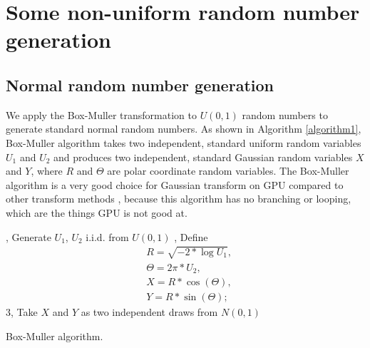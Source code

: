 \documentclass[article,nojss]{jss}\usepackage[]{graphicx}\usepackage[]{color}
\begin{document}







\section{Some non-uniform random number generation}
\subsection{Normal random number generation}
We apply the Box-Muller transformation to $U(0,1)$ random numbers to generate standard normal random numbers. As shown in Algorithm \ref{algorithm1}, Box-Muller algorithm takes two independent, standard uniform random variables $U_1$ and $U_2$ and produces two independent, standard Gaussian random variables $X$ and $Y$, where $R$ and $\Theta$ are polar coordinate random variables. %
The Box-Muller algorithm is a very good choice for Gaussian transform on GPU compared to other transform methods \citep{howes2007efficient}, because this algorithm has no branching or looping, which are the things GPU is not good at. %

\begin{algorithm}[ht] 
, Generate $U_1$, $U_2$ i.i.d. from $U (0,1)$ , Define \begin{align*} 
& R = \sqrt{-2*\log U_1},\\
&  \Theta = 2\pi*U_2,\\
&  X=R*\cos(\Theta),\\
& Y=R*\sin(\Theta);\;\end{align*}
 3, Take $X$ and $Y$ as two independent draws from $N(0,1)$\;
 \caption{Box-Muller algorithm.}
 \label{algorithm1}
\end{algorithm}
\end{document}
